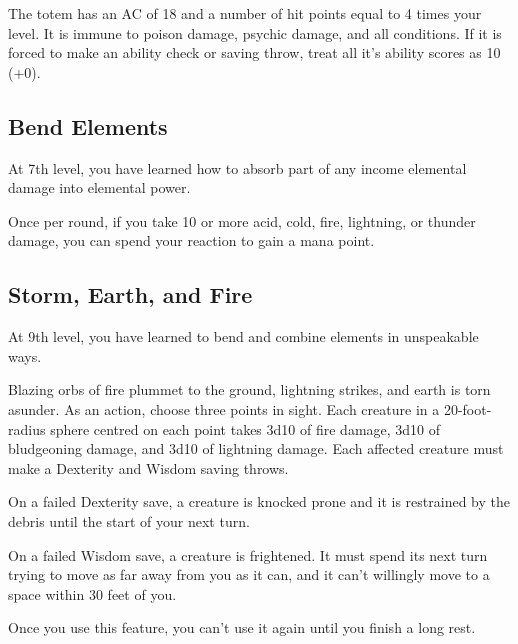 \begin{multicols*}{2}
The totem has an AC of 18 and a number of hit points equal to 4 times your level. It is immune to poison damage, psychic damage, and all conditions. If it is forced to make an ability check or saving throw, treat all it's ability scores as 10 (+0). 


\subsection*{Bend Elements}

At 7th level, you have learned how to absorb part of any income elemental damage into elemental power.

Once per round, if you take 10 or more acid, cold, fire, lightning, or thunder damage, you can spend your reaction to gain a mana point.

\subsection*{Storm, Earth, and Fire}

At 9th level, you have learned to bend and combine elements in unspeakable ways.

Blazing orbs of fire plummet to the ground, lightning strikes, and earth is torn asunder. As an action, choose three points in sight. Each creature in a 20-foot-radius sphere centred on each point takes 3d10 of fire damage, 3d10 of bludgeoning damage, and 3d10 of lightning damage.
Each affected creature must make a Dexterity and Wisdom saving throws.


On a failed Dexterity save, a creature is knocked prone and it is restrained by the debris until the start of your next turn.

On a failed Wisdom save, a creature is frightened. It must spend its next turn trying to move as far away from you as it can, and it can't willingly move to a space within 30 feet of you.


Once you use this feature, you can’t use it again until you finish a long rest.




\end{multicols*}
